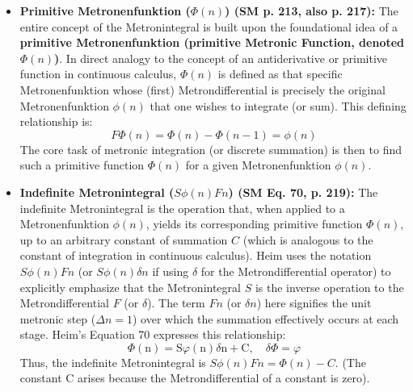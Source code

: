 \documentclass[12pt]{article}
\newcommand{\metrondifferential}{F} %
\newcommand{\metronintegral}{S} %
\newcommand{\metronenziffer}{n}
\begin{document}
\begin{itemize}
    \item \textbf{Primitive Metronenfunktion (\( \Phi(\metronenziffer) \)) (SM p. 213, also p. 217):}
    The entire concept of the Metronintegral is built upon the foundational idea of a \textbf{primitive Metronenfunktion (primitive Metronic Function, denoted \( \Phi(\metronenziffer) \))}. In direct analogy to the concept of an antiderivative or primitive function in continuous calculus, \( \Phi(\metronenziffer) \) is defined as that specific Metronenfunktion whose (first) Metrondifferential is precisely the original Metronenfunktion \( \phi(\metronenziffer) \) that one wishes to integrate (or sum). This defining relationship is:
    \[ \metrondifferential\Phi(\metronenziffer) = \Phi(\metronenziffer) - \Phi(\metronenziffer-1) = \phi(\metronenziffer) \]
    The core task of metronic integration (or discrete summation) is then to find such a primitive function \( \Phi(\metronenziffer) \) for a given Metronenfunktion \( \phi(\metronenziffer) \).

    \item \textbf{Indefinite Metronintegral (\( \metronintegral\phi(\metronenziffer)\metrondifferential\metronenziffer \)) (SM Eq. 70, p. 219):}
    The indefinite Metronintegral is the operation that, when applied to a Metronenfunktion \( \phi(\metronenziffer) \), yields its corresponding primitive function \( \Phi(\metronenziffer) \), up to an arbitrary constant of summation \( C \) (which is analogous to the constant of integration in continuous calculus). Heim uses the notation \( \metronintegral \phi(\metronenziffer) \metrondifferential\metronenziffer \) (or \( \metronintegral \phi(\metronenziffer) \delta \metronenziffer \) if using \( \delta \) for the Metrondifferential operator) to explicitly emphasize that the Metronintegral \( \metronintegral \) is the inverse operation to the Metrondifferential \( \metrondifferential \) (or \( \delta \)). The term \( \metrondifferential\metronenziffer \) (or \( \delta \metronenziffer \)) here signifies the unit metronic step (\( \Delta \metronenziffer=1 \)) over which the summation effectively occurs at each stage. Heim's Equation 70 expresses this relationship:
    \begin{equation}
    \Phi(\mathrm{n}) = \mathrm{S}\varphi(\mathrm{n})\delta\mathrm{n} + \mathrm{C}, \quad \delta\Phi = \varphi \tag{70}
    \label{eq:original_indefinite_metronintegral}
    \end{equation}
    Thus, the indefinite Metronintegral is \( \metronintegral\phi(\metronenziffer)\metrondifferential\metronenziffer = \Phi(\metronenziffer) - C \). (The constant C arises because the Metrondifferential of a constant is zero).


\end{itemize}
\end{document}
